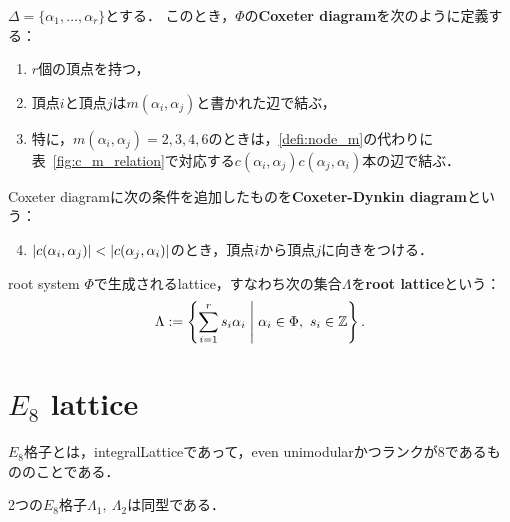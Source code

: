 \begin{defi}
  $\Delta = \{\alpha_1, \ldots, \alpha_r\}$とする．
  このとき，$\Phi$の\textbf{Coxeter diagram}を次のように定義する：
  \begin{enumerate}[label=(\roman*)]
    \item $r$個の頂点を持つ，
    \item 頂点$i$と頂点$j$は$m(\alpha_i, \alpha_j)$と書かれた辺で結ぶ，\label{defi:node_m}
    \item 特に，$m(\alpha_i, \alpha_j) = 2, 3, 4, 6$のときは，\ref{defi:node_m}の代わりに表~\ref{fig:c_m_relation}で対応する$c(\alpha_i, \alpha_j) c(\alpha_j, \alpha_i)$本の辺で結ぶ．
  \end{enumerate}
\end{defi}

\begin{defi}
  Coxeter diagramに次の条件を追加したものを\textbf{Coxeter-Dynkin diagram}という：
  \begin{enumerate}[label=(\roman*)]
    \setcounter{enumi}{3}
    \item $\left| c(\alpha_i, \alpha_j) \right| < \left| c(\alpha_j, \alpha_i) \right|$のとき，頂点$i$から頂点$j$に向きをつける．
  \end{enumerate}
\end{defi}

\begin{defi}
  root system $\Phi$で生成されるlattice，すなわち次の集合$\Lambda$を\textbf{root lattice}という：
  \begin{equation}
    \Lambda := \left\lbrace \sum_{i=1}^{r} s_i \alpha_i \mathrel{} \middle| \mathrel{} \alpha_i \in \Phi,\ s_i \in \mathbb{Z} \right\rbrace.
  \end{equation}
\end{defi}

\section{$E_8$ lattice}

\begin{defi}
  \label{defi:E8Lattice}
  \leanok
  $E_8$格子とは，integralLatticeであって，even unimodularかつランクが$8$であるもののことである．
\end{defi}

\begin{thm}
  \label{thm:unique}
  \leanok
  2つの$E_8$格子$\Lambda_1,\ \Lambda_2$は同型である．
\end{thm}

